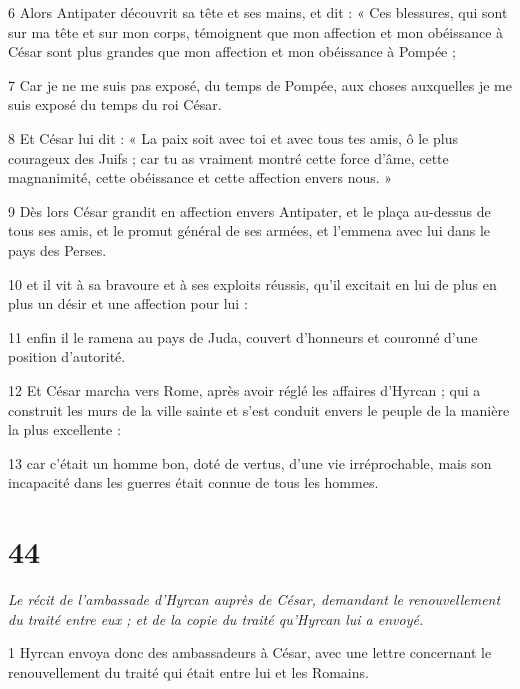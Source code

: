 \par 6 Alors Antipater découvrit sa tête et ses mains, et dit : « Ces blessures, qui sont sur ma tête et sur mon corps, témoignent que mon affection et mon obéissance à César sont plus grandes que mon affection et mon obéissance à Pompée ;

\par 7 Car je ne me suis pas exposé, du temps de Pompée, aux choses auxquelles je me suis exposé du temps du roi César.

\par 8 Et César lui dit : « La paix soit avec toi et avec tous tes amis, ô le plus courageux des Juifs ; car tu as vraiment montré cette force d'âme, cette magnanimité, cette obéissance et cette affection envers nous. »

\par 9 Dès lors César grandit en affection envers Antipater, et le plaça au-dessus de tous ses amis, et le promut général de ses armées, et l'emmena avec lui dans le pays des Perses.

\par 10 et il vit à sa bravoure et à ses exploits réussis, qu'il excitait en lui de plus en plus un désir et une affection pour lui :

\par 11 enfin il le ramena au pays de Juda, couvert d'honneurs et couronné d'une position d'autorité.

\par 12 Et César marcha vers Rome, après avoir réglé les affaires d'Hyrcan ; qui a construit les murs de la ville sainte et s'est conduit envers le peuple de la manière la plus excellente :

\par 13 car c'était un homme bon, doté de vertus, d'une vie irréprochable, mais son incapacité dans les guerres était connue de tous les hommes.


\chapter{44}

\par \textit{Le récit de l'ambassade d'Hyrcan auprès de César, demandant le renouvellement du traité entre eux ; et de la copie du traité qu'Hyrcan lui a envoyé.}

\par 1 Hyrcan envoya donc des ambassadeurs à César, avec une lettre concernant le renouvellement du traité qui était entre lui et les Romains.

